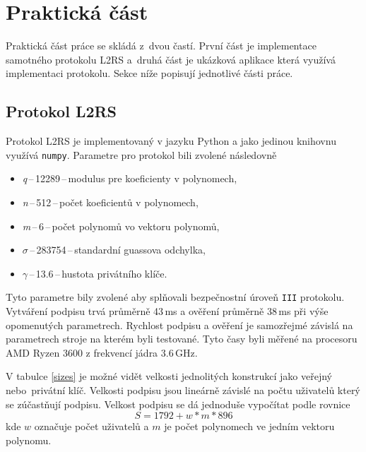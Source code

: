 
\newcommand{\param}[2]{\textit{#1}\,--\,#2\,--\,}
\newcommand{\paramnott}[2]{#1\,--\,#2\,--\,}

\chapter{Praktická část}
Praktická část práce se skládá z~dvou častí. První část je implementace samotného protokolu L2RS a~druhá část je ukázková aplikace která využívá implementaci protokolu. Sekce níže popisují jednotlivé části práce.

\section{Protokol L2RS}
Protokol L2RS je implementovaný v jazyku Python a jako jedinou knihovnu využívá \texttt{numpy}. Parametre pro protokol bili zvolené následovně
\begin{itemize}
  \item \param{q}{12289}modulus pre koeficienty v polynomech,
  \item \param{n}{512}počet koeficientů v polynomech,
  \item \param{m}{6}počet polynomů vo vektoru polynomů,
  \item \paramnott{$\sigma$}{283754}standardní guassova odchylka,
  \item \paramnott{$\gamma$}{13.6}hustota privátního klíče.
\end{itemize}
Tyto parametre bily zvolené aby splňovali bezpečnostní úroveň \texttt{III} protokolu. Vytváření podpisu trvá průměrně 43\,ms a ověření průměrně 38\,ms při výše opomenutých parametrech. Rychlost podpisu a ověření je samozřejmé závislá na parametrech stroje na kterém byli testované. Tyto časy byli měřené na procesoru AMD Ryzen 3600 z frekvencí jádra 3.6\,GHz.

V tabulce \ref{sizes} je možné vidět velkosti jednolitých konstrukcí jako veřejný nebo~privátní klíč. Velkosti podpisu jsou lineárně závislé na počtu uživatelů který se zúčastňují podpisu. Velkost podpisu se dá jednoduše vypočítat podle rovnice
\begin{equation}
  S=1792+w*m*896
\end{equation}
kde $w$ označuje počet uživatelů a $m$ je počet polynomech ve jedním vektoru polynomu.

